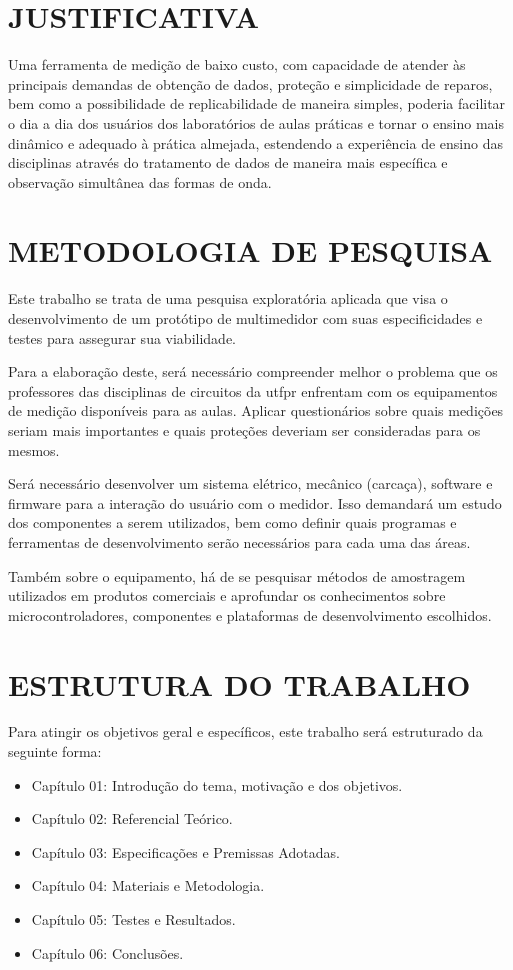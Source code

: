 \section{JUSTIFICATIVA}\label{sec:justificativa}
Uma ferramenta de medição de baixo custo, com capacidade de atender às principais demandas de obtenção de dados, proteção e simplicidade de reparos, bem como a possibilidade de replicabilidade de maneira simples, poderia facilitar o dia a dia dos usuários dos laboratórios de aulas práticas e tornar o ensino mais dinâmico e adequado à prática almejada, estendendo a experiência de ensino das disciplinas através do tratamento de dados de maneira mais específica e observação simultânea das formas de onda.

\section{METODOLOGIA DE PESQUISA}\label{sec:metodologiapesq}
Este trabalho se trata de uma pesquisa exploratória aplicada que visa o desenvolvimento de um protótipo de multimedidor com suas especificidades e testes para assegurar sua viabilidade.

Para a elaboração deste, será necessário compreender melhor o problema que os professores das disciplinas de circuitos da \gls{utfpr} enfrentam com os equipamentos de medição disponíveis para as aulas. Aplicar questionários sobre quais medições seriam mais importantes e quais proteções deveriam ser consideradas para os mesmos.

Será necessário desenvolver um sistema elétrico, mecânico (carcaça), software e firmware para a interação do usuário com o medidor. Isso demandará um estudo dos componentes a serem utilizados, bem como definir quais programas e ferramentas de desenvolvimento serão necessários para cada uma das áreas.

Também sobre o equipamento, há de se pesquisar métodos de amostragem utilizados em produtos comerciais e aprofundar os conhecimentos sobre microcontroladores, componentes e plataformas de desenvolvimento escolhidos.

\section{ESTRUTURA DO TRABALHO}\label{sec:estruturatrab}

Para atingir os objetivos geral e específicos, este trabalho será estruturado da seguinte forma:

\begin{itemize}
    \item Capítulo 01: Introdução do tema, motivação e dos objetivos.
    \item Capítulo 02: Referencial Teórico.
    \item Capítulo 03: Especificações e Premissas Adotadas.
    \item Capítulo 04: Materiais e Metodologia.
    \item Capítulo 05: Testes e Resultados.
    \item Capítulo 06: Conclusões.
\end{itemize}

